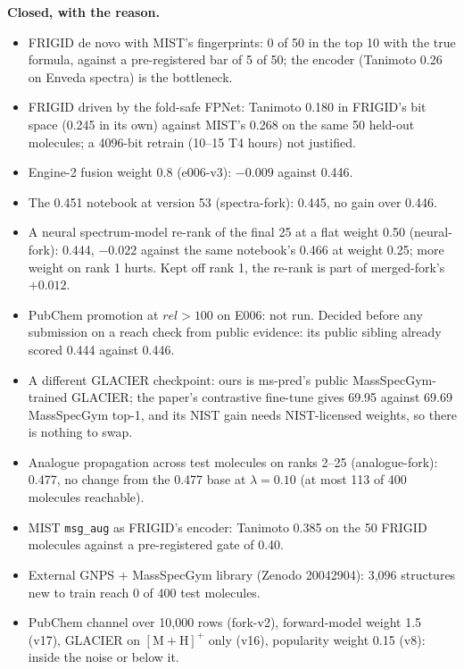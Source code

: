 \documentclass[11pt]{article}
\begin{document}
\textbf{Closed, with the reason.}
\begin{itemize}
  \item FRIGID de novo with MIST's fingerprints: 0 of 50 in the top 10 with the true formula, against
    a pre-registered bar of 5 of 50; the encoder (Tanimoto 0.26 on Enveda spectra) is the bottleneck.
  \item FRIGID driven by the fold-safe FPNet: Tanimoto 0.180 in FRIGID's bit space (0.245 in its own)
    against MIST's 0.268 on the same 50 held-out molecules; a 4096-bit retrain (10--15 T4 hours) not justified.
  \item Engine-2 fusion weight 0.8 (e006-v3): $-0.009$ against 0.446.
  \item The 0.451 notebook at version 53 (spectra-fork): 0.445, no gain over 0.446.
  \item A neural spectrum-model re-rank of the final 25 at a flat weight 0.50 (neural-fork): 0.444, $-0.022$
    against the same notebook's 0.466 at weight 0.25; more weight on rank 1 hurts. Kept off rank 1, the
    re-rank is part of merged-fork's $+0.012$.
  \item PubChem promotion at $\mathit{rel} > 100$ on E006: not run. Decided before any submission on
    a reach check from public evidence: its public sibling already scored 0.444 against 0.446.
  \item A different GLACIER checkpoint: ours is ms-pred's public MassSpecGym-trained GLACIER; the
    paper's contrastive fine-tune gives 69.95 against 69.69 MassSpecGym top-1, and its NIST gain needs
    NIST-licensed weights, so there is nothing to swap.
  \item Analogue propagation across test molecules on ranks 2--25 (analogue-fork): 0.477, no change from
    the 0.477 base at $\lambda = 0.10$ (at most 113 of 400 molecules reachable).
  \item MIST \texttt{msg\_aug} as FRIGID's encoder: Tanimoto 0.385 on the 50 FRIGID molecules against a
    pre-registered gate of 0.40.
  \item External GNPS + MassSpecGym library (Zenodo 20042904): 3{,}096 structures new to train reach 0 of
    400 test molecules.
  \item PubChem channel over 10{,}000 rows (fork-v2), forward-model weight 1.5 (v17), GLACIER on
    $[\mathrm{M{+}H}]^+$ only (v16), popularity weight 0.15 (v8): inside the noise or below it.
\end{itemize}
\end{document}
